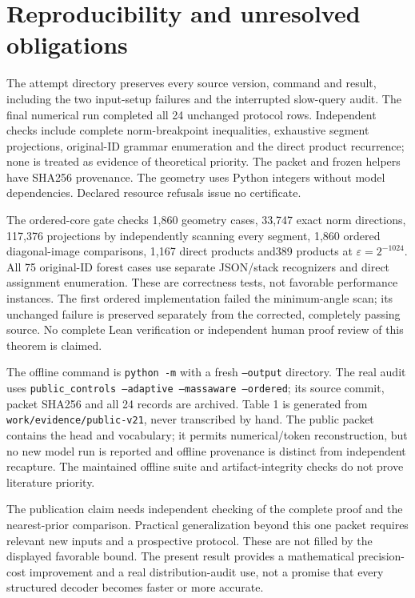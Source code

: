 \documentclass[11pt]{article}
\begin{document}
\section{Reproducibility and unresolved obligations}
The attempt directory preserves every source version, command and result,
including the two input-setup failures and the interrupted slow-query audit.
The final numerical run completed all 24 unchanged protocol rows. Independent checks
include complete norm-breakpoint inequalities, exhaustive segment projections,
original-ID grammar enumeration and the direct product recurrence; none is
treated as evidence of theoretical priority. The packet and frozen helpers
have SHA256 provenance. The geometry uses Python integers without model
dependencies. Declared resource refusals issue no certificate.

The ordered-core gate checks 1,860 geometry cases, 33,747 exact norm directions,
117,376 projections by independently scanning every segment, 1,860 ordered
diagonal-image comparisons, 1,167 direct products and389 products at
$\varepsilon=2^{-1024}$. All 75 original-ID forest cases use separate JSON/stack
recognizers and direct assignment enumeration. These are correctness tests,
not favorable performance instances. The first ordered implementation failed
the minimum-angle scan; its unchanged failure is preserved separately from
the corrected, completely passing source. No complete Lean verification or
independent human proof review of this theorem is claimed.

The offline command is \texttt{python -m}
with a fresh \texttt{--output} directory. The real audit uses
\texttt{public\_controls --adaptive --massaware --ordered}; its source commit,
packet SHA256 and all 24 records are archived. Table 1 is generated from
\texttt{work/evidence/public-v21}, never transcribed by hand. The public packet
contains the head and vocabulary; it permits numerical/token reconstruction,
but no new model run is reported and offline provenance is distinct from
independent recapture. The maintained offline suite and artifact-integrity
checks do not prove literature priority.

The publication claim needs independent checking of the complete proof and
the nearest-prior comparison. Practical generalization beyond this one packet
requires relevant new inputs and a prospective protocol. These are not filled
by the displayed favorable bound. The present result provides a mathematical
precision-cost improvement and a real distribution-audit use, not a promise
that every structured decoder becomes faster or more accurate.
\end{document}
